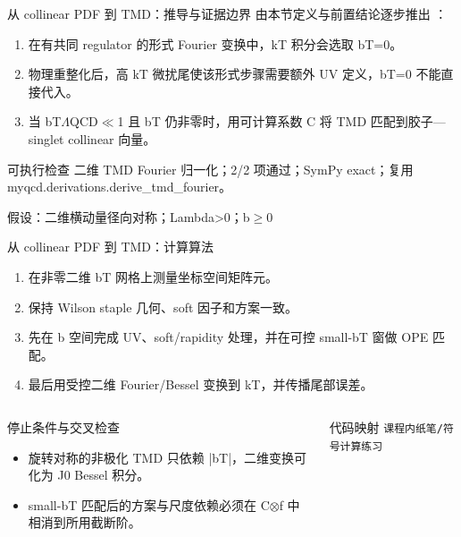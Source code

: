 \begin{frame}[t]{从 collinear PDF 到 TMD：推导与证据边界}
\footnotesize
{}\quad 由本节定义与前置结论逐步推出 ：
\begin{enumerate}
\item 在有共同 regulator 的形式 Fourier 变换中，kT 积分会选取 bT=0。
\item 物理重整化后，高 kT 微扰尾使该形式步骤需要额外 UV 定义，bT=0 不能直接代入。
\item 当 bT\ensuremath{\Lambda}QCD\ensuremath{\ll}1 且 bT 仍非零时，用可计算系数 C 将 TMD 匹配到胶子—singlet collinear 向量。
\end{enumerate}\begin{block}{可执行检查}
\quad 二维 TMD Fourier 归一化；2/2 项通过；SymPy exact；复用 myqcd.derivations.derive\_tmd\_fourier。
\par\scriptsize 假设：二维横动量径向对称；Lambda>0；b\ensuremath{\ge}0
\end{block}
\end{frame}

\begin{frame}[t]{从 collinear PDF 到 TMD：计算算法}
\footnotesize
{}\begin{enumerate}
\item 在非零二维 bT 网格上测量坐标空间矩阵元。
\item 保持 Wilson staple 几何、soft 因子和方案一致。
\item 先在 b 空间完成 UV、soft/\allowbreak{}rapidity 处理，并在可控 small-bT 窗做 OPE 匹配。
\item 最后用受控二维 Fourier/\allowbreak{}Bessel 变换到 kT，并传播尾部误差。
\end{enumerate}\begin{columns}[T,onlytextwidth]
\begin{block}{停止条件与交叉检查}\scriptsize\begin{itemize}
\item[\CheckMark] 旋转对称的非极化 TMD 只依赖 |bT|，二维变换可化为 J0 Bessel 积分。
\item[\CheckMark] small-bT 匹配后的方案与尺度依赖必须在 C\ensuremath{\otimes}f 中相消到所用截断阶。
\end{itemize}\end{block}
\begin{block}{代码映射}
\scriptsize \texttt{课程内纸笔/\allowbreak{}符号计算练习}
\end{block}\end{columns}\end{frame}

